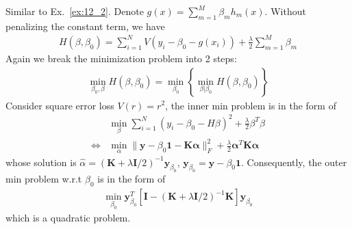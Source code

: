 \begin{exercise}
  Similar to Ex.~\eqref{ex:12_2}. Denote $g(x)=\sum_{m=1}^M\beta_mh_m(x)$.
  Without penalizing the constant term, we have
  \begin{align}
    H\left(\beta, \beta_{0}\right)=\sum_{i=1}^{N} V\left(y_{i}-\beta_{0}-g\left(x_{i}\right)\right)+\frac{\lambda}{2} \sum_{m=1}^{M} \beta_{m}
  \end{align}
  Again we break the minimization problem into 2 steps:
  \begin{align}
    \min_{\beta_0,\beta}H(\beta, \beta_0) =
    \min_{\beta_0}\left\{\min_{\beta|\beta_0}H(\beta, \beta_0)\right\}
  \end{align}
  Consider square error loss $V(r) = r^2$, the inner min problem is in the form
  of 
  \begin{align}
    & \min_{\beta}\sum_{i=1}^N
    (y_i-\beta_0-H\beta)^2 + \frac{\lambda}{2}\beta^T\beta \\
    \Leftrightarrow & \min_\alpha \|\mathbf{y} - \beta_0\mathbf{1} -
    \mathbf{K}\bm{\alpha}\|_F^2 +
    \frac{\lambda}{2}\bm{\alpha}^T\mathbf{K}\bm{\alpha}
  \end{align}
  whose solution is $\hat{\alpha} = (\mathbf{K} +
  \lambda\mathbf{I}/2)^{-1}\mathbf{y}_{\beta_0}$, $\mathbf{y}_{\beta_0} =
  \mathbf{y} - \beta_0\mathbf{1}$. Consequently, the outer min problem w.r.t
  $\beta_0$ is in the form of
  \begin{align}
    \min_{\beta_0} \mathbf{y}_{\beta_0}^T\left[\mathbf{I} - (\mathbf{K} +
    \lambda\mathbf{I}/2)^{-1}\mathbf{K}\right]\mathbf{y}_{\beta_0}
  \end{align}
  which is a quadratic problem.
\end{exercise}

